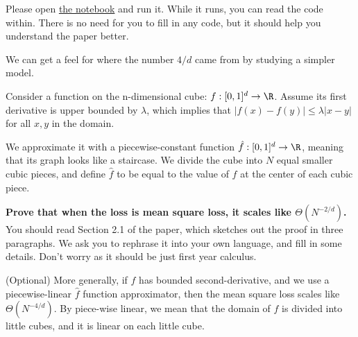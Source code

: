 \begin{enumerate}
    \qitem Please open \href{\colabgiturl/\questionname/q_scaling_data_manifold.ipynb}{the notebook} and run it. While it runs, you can read the code within. There is no need for you to fill in any code, but it should help you understand the paper better.

    \qitem We can get a feel for where the number $4/d$ came from by studying a simpler model.
    
    Consider a function on the n-dimensional cube: $f: [0, 1]^d \to \R$. Assume its first derivative is upper bounded by $\lambda$, which implies that $|f(x) - f(y)| \leq \lambda |x-y|$ for all $x, y$ in the domain. 
    
    We approximate it with a piecewise-constant function $\hat f: [0, 1]^d \to \R$, meaning that its graph looks like a staircase. We divide the cube into $N$ equal smaller cubic pieces, and define $\hat f$ to be equal to the value of $f$ at the center of each cubic piece.
    
    \textbf{Prove that when the loss is mean square loss, it scales like $\Theta(N^{-2/d})$.} You should read Section 2.1 of the paper, which sketches out the proof in three paragraphs. We ask you to rephrase it into your own language, and fill in some details. Don't worry as it should be just first year calculus.


    \qitem (Optional) More generally, if $f$ has bounded second-derivative, and we use a piecewise-linear $\hat f$ function approximator, then the mean square loss scales like $\Theta(N^{-4/d})$. By piece-wise linear, we mean that the domain of $\hat f$ is divided into little cubes, and it is linear on each little cube. 
    

\end{enumerate}
